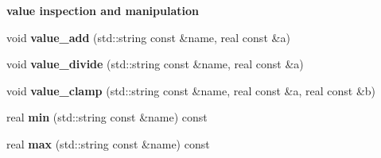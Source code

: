 \begin{Indent}{\bf value inspection and manipulation}\par
\begin{DoxyCompactItemize}
\item 
\hypertarget{classPatch__Group_a71f920e68d637daa7b0640475e332610}{void {\bfseries value\+\_\+add} (std\+::string const \&name, real const \&a)}\label{classPatch__Group_a71f920e68d637daa7b0640475e332610}

\item 
\hypertarget{classPatch__Group_a7bd8b492bbf0897a97e4d75da704c9ae}{void {\bfseries value\+\_\+divide} (std\+::string const \&name, real const \&a)}\label{classPatch__Group_a7bd8b492bbf0897a97e4d75da704c9ae}

\item 
\hypertarget{classPatch__Group_a0ac40fd6ce722469909d6561f755f6de}{void {\bfseries value\+\_\+clamp} (std\+::string const \&name, real const \&a, real const \&b)}\label{classPatch__Group_a0ac40fd6ce722469909d6561f755f6de}

\item 
\hypertarget{classPatch__Group_a1d99180b4ae46d848fc34b385e06b349}{real {\bfseries min} (std\+::string const \&name) const }\label{classPatch__Group_a1d99180b4ae46d848fc34b385e06b349}

\item 
\hypertarget{classPatch__Group_aef159a2eadb32354ac1bbff72e6674b0}{real {\bfseries max} (std\+::string const \&name) const }\label{classPatch__Group_aef159a2eadb32354ac1bbff72e6674b0}

\end{DoxyCompactItemize}
\end{Indent}
